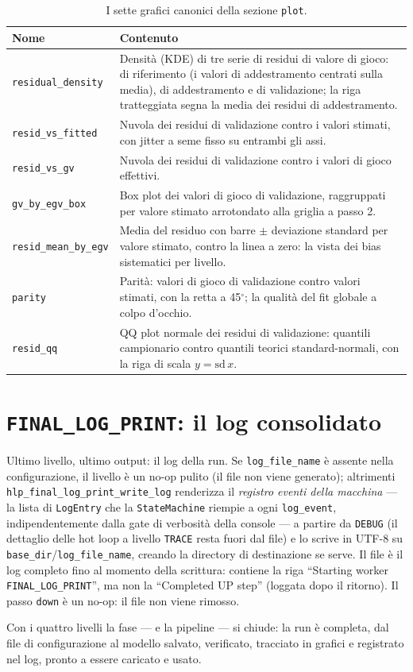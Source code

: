 \begin{table}[htbp]
\centering
\small
\begin{tabularx}{\textwidth}{lX}
\toprule
Nome & Contenuto \\
\midrule
\texttt{residual\_density} & Densità (KDE) di tre serie di residui di valore di gioco: di riferimento (i valori di addestramento centrati sulla media), di addestramento e di validazione; la riga tratteggiata segna la media dei residui di addestramento. \\
\texttt{resid\_vs\_fitted} & Nuvola dei residui di validazione contro i valori stimati, con jitter a seme fisso su entrambi gli assi. \\
\texttt{resid\_vs\_gv} & Nuvola dei residui di validazione contro i valori di gioco effettivi. \\
\texttt{gv\_by\_egv\_box} & Box plot dei valori di gioco di validazione, raggruppati per valore stimato arrotondato alla griglia a passo 2. \\
\texttt{resid\_mean\_by\_egv} & Media del residuo con barre $\pm$ deviazione standard per valore stimato, contro la linea a zero: la vista dei bias sistematici per livello. \\
\texttt{parity} & Parità: valori di gioco di validazione contro valori stimati, con la retta a 45$^\circ$; la qualità del fit globale a colpo d'occhio. \\
\texttt{resid\_qq} & QQ plot normale dei residui di validazione: quantili campionario contro quantili teorici standard-normali, con la riga di scala $y=\mathrm{sd}\,x$. \\
\bottomrule
\end{tabularx}
\caption{I sette grafici canonici della sezione \texttt{plot}.}
\label{tab:plot-names}
\end{table}

\section{\texttt{FINAL\_LOG\_PRINT}: il log consolidato}

Ultimo livello, ultimo output: il log della run. Se
\texttt{log\_file\_name} è assente nella configurazione, il livello è un
no-op pulito (il file non viene generato); altrimenti
\texttt{hlp\_final\_log\_print\_write\_log} renderizza il \emph{registro
eventi della macchina} — la lista di \texttt{LogEntry} che la
\texttt{StateMachine} riempie a ogni \texttt{log\_event},
indipendentemente dalla gate di verbosità della console — a partire da
\texttt{DEBUG} (il dettaglio delle hot loop a livello \texttt{TRACE} resta
fuori dal file) e lo scrive in UTF-8 su \texttt{base\_dir}/\texttt{log\_file\_name},
creando la directory di destinazione se serve. Il file è il log completo
fino al momento della scrittura: contiene la riga ``Starting worker
\texttt{FINAL\_LOG\_PRINT}'', ma non la ``Completed UP step'' (loggata
dopo il ritorno). Il passo \texttt{down} è un no-op: il file non viene
rimosso.

Con i quattro livelli la fase — e la pipeline — si chiude: la run è
completa, dal file di configurazione al modello salvato, verificato,
tracciato in grafici e registrato nel log, pronto a essere caricato e
usato.
